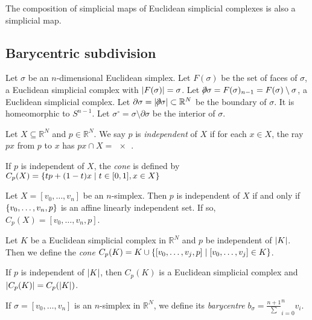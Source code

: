 \begin{remark}
	The composition of simplicial maps of Euclidean simplicial complexes is also a simplicial map.
\end{remark}

\subsection{Barycentric subdivision}
\begin{definition}
	Let \( \sigma \) be an \( n \)-dimensional Euclidean simplex.
	Let \( F(\sigma) \) be the set of faces of \( \sigma \), a Euclidean simplicial complex with \( \abs{F(\sigma)} = \sigma \).
	Let \( \bound \sigma = F(\sigma)_{n-1} = F(\sigma) \setminus \sigma \), a Euclidean simplicial complex.
	Let \( \partial \sigma = \abs{\bound \sigma} \subset \mathbb R^N \) be the boundary of \( \sigma \).
	It is homeomorphic to \( S^{n-1} \).
	Let \( \sigma^\circ = \sigma \setminus \partial \sigma \) be the interior of \( \sigma \).
\end{definition}
\begin{definition}
	Let \( X \subseteq \mathbb R^N \) and \( p \in \mathbb R^N \).
	We say \( p \) is \emph{independent} of \( X \) if for each \( x \in X \), the ray \( px \) from \( p \) to \( x \) has \( px \cap X = \qty{x} \).
\end{definition}
\begin{definition}
	If \( p \) is independent of \( X \), the \emph{cone} is defined by \( C_p(X) = \qty{tp + (1-t)x \mid t \in [0,1], x \in X} \)
\end{definition}
\begin{example}
	Let \( X = [v_0,\dots,v_n] \) be an \( n \)-simplex.
	Then \( p \) is independent of \( X \) if and only if \( \qty{v_0, \dots, v_n, p} \) is an affine linearly independent set.
	If so, \( C_p(X) = [v_0, \dots, v_n, p] \).
\end{example}
\begin{definition}
	Let \( K \) be a Euclidean simplicial complex in \( \mathbb R^N \) and \( p \) be independent of \( \abs{K} \).
	Then we define the \emph{cone} \( C_p(K) = K \cup \qty{[v_0, \dots, v_j, p] \mid [v_0, \dots, v_j] \in K} \).
\end{definition}
\begin{lemma}
	If \( p \) is independent of \( \abs{K} \), then \( C_p(K) \) is a Euclidean simplicial complex and \( \abs{C_p(K)} = C_p(\abs{K}) \).
\end{lemma}
\begin{definition}
	If \( \sigma = [v_0, \dots, v_n] \) is an \( n \)-simplex in \( \mathbb R^N \), we define its \emph{barycentre} \( b_\sigma = \frac{n+1}\sum_{i=0}^n v_i \).
\end{definition}

